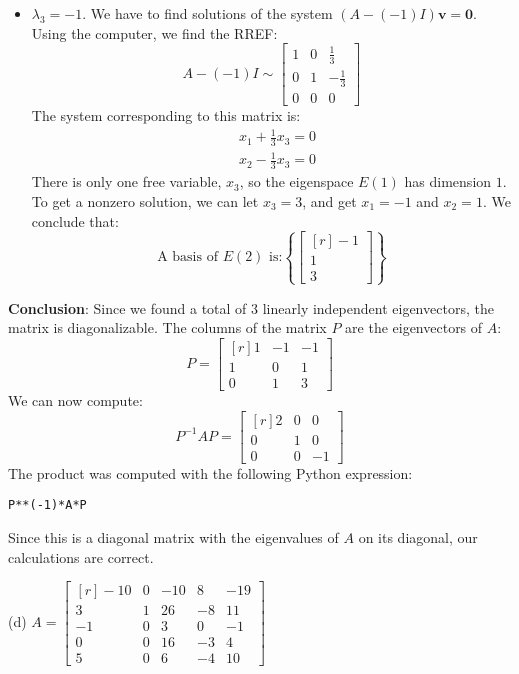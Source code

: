 \documentclass[12pt]{article}
\begin{document}
\begin{itemize}
\item $\lambda_3=-1$. We have to find solutions of the system $(A-(-1)I)\mathbf{v}=\mathbf{0}$. Using the computer, we find the RREF:
\[
A-(-1)I\sim\left[\begin{matrix}1 & 0 & \frac{1}{3}\\0 & 1 & - \frac{1}{3}\\0 & 0 & 0\end{matrix}\right]
\]
The system corresponding to this matrix is:
\begin{align*}
&x_1+\frac{1}{3}x_3=0\\
&x_2-\frac{1}{3}x_3=0
\end{align*}
There is only one free variable, $x_3$, so the eigenspace $E(1)$ has dimension $1$.
To get a nonzero solution, we can let $x_3=3$, and get $x_1=-1$ and $x_2=1$. We conclude that:
\[
\text{A basis of $E(2)$ is:} \left\{\begin{bmatrix*}[r]-1\\1\\3\end{bmatrix*}\right\}
\]
\end{itemize}

\textbf{Conclusion}: Since we found a total of 3 linearly independent eigenvectors, the matrix is diagonalizable. The columns of the matrix $P$ are the eigenvectors of $A$:
\[
P=\left[\begin{matrix*}[r]1 & -1 & -1\\1 & 0 & 1\\0 & 1 & 3\end{matrix*}\right]
\]
We can now compute:
\[
P^{-1}AP=\left[\begin{matrix*}[r]2 & 0 & 0\\0 & 1 & 0\\0 & 0 & -1\end{matrix*}\right]
\]
The product was computed with the following Python expression:
\begin{lstlisting}
P**(-1)*A*P
\end{lstlisting}
Since this is a diagonal matrix with the eigenvalues of $A$ on its diagonal, our calculations are correct.
\proofend

\medskip
(d) $A=\left[\begin{matrix*}[r]-10 & 0 & -10 & 8 & -19\\3 & 1 & 26 & -8 & 11\\-1 & 0 & 3 & 0 & -1\\0 & 0 & 16 & -3 & 4\\5 & 0 & 6 & -4 & 10\end{matrix*}\right]$
\end{document}
